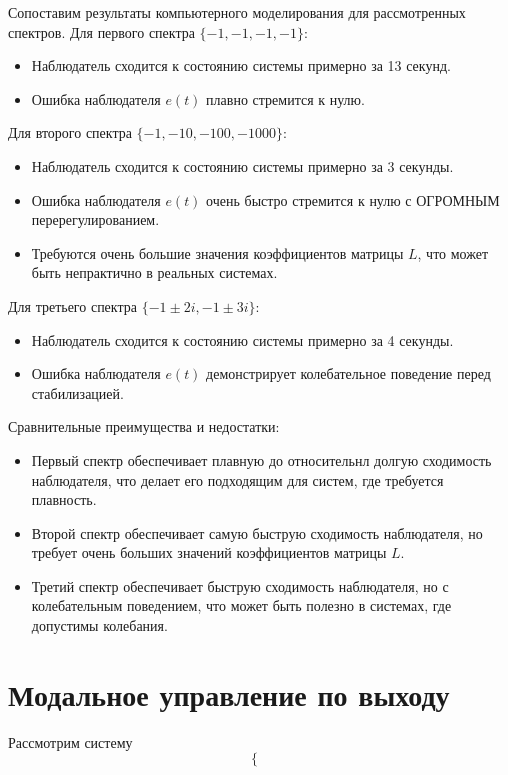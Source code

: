 Сопоставим результаты компьютерного моделирования для рассмотренных спектров.
Для первого спектра $\{-1, -1, -1, -1\}$:
\begin{itemize}
    \item Наблюдатель сходится к состоянию системы примерно за 13 секунд.
    \item Ошибка наблюдателя $e(t)$ плавно стремится к нулю.
\end{itemize}
Для второго спектра $\{-1, -10, -100, -1000\}$:
\begin{itemize}
    \item Наблюдатель сходится к состоянию системы примерно за 3 секунды.
    \item Ошибка наблюдателя $e(t)$ очень быстро стремится к нулю с ОГРОМНЫМ
    перерегулированием.
    \item Требуются очень большие значения коэффициентов матрицы $L$, 
    что может быть непрактично в реальных системах.
\end{itemize}
Для третьего спектра $\{-1 \pm 2i, -1 \pm 3i\}$:
\begin{itemize}
    \item Наблюдатель сходится к состоянию системы примерно за 4 секунды.
    \item Ошибка наблюдателя $e(t)$ демонстрирует колебательное поведение 
    перед стабилизацией.
\end{itemize}
Сравнительные преимущества и недостатки:
\begin{itemize}
    \item Первый спектр обеспечивает плавную до относительнл долгую сходимость наблюдателя, 
    что делает его подходящим для систем, где требуется плавность.
    \item Второй спектр обеспечивает самую быструю сходимость наблюдателя, 
    но требует очень больших значений коэффициентов матрицы $L$.
    \item Третий спектр обеспечивает быструю сходимость наблюдателя,
    но с колебательным поведением, что может быть полезно в системах, 
    где допустимы колебания.
\end{itemize}



\section{Модальное управление по выходу}

Рассмотрим систему 
\begin{equation*}
    \begin{cases}
        
    \end{cases}
\end{equation*}